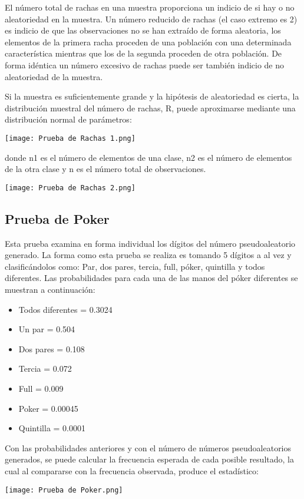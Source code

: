 \documentclass{article}
\begin{document}
El número total de rachas en una muestra proporciona un indicio de si hay o no aleatoriedad en la muestra. Un número reducido de rachas (el caso extremo es 2) es indicio de que las observaciones no se han extraído de forma aleatoria, los elementos de la primera racha proceden de una población con una determinada característica mientras que los de la segunda proceden de otra población. De forma idéntica un número excesivo de rachas puede ser también indicio de no aleatoriedad de la muestra.

Si la muestra es suficientemente grande y la hipótesis de aleatoriedad es cierta, la distribución muestral del número de rachas, R, puede aproximarse mediante una distribución normal de parámetros:
\begin{center}
    \texttt{[image: Prueba de Rachas 1.png]}
\end{center}

donde n1 es el número de elementos de una clase, n2 es el número de elementos de la otra clase y n es el número total de observaciones.
\begin{center}
    \texttt{[image: Prueba de Rachas 2.png]}
\end{center}

\subsection{Prueba de Poker}
Esta prueba examina en forma individual los dígitos del número pseudoaleatorio generado. La forma como esta prueba se realiza es tomando 5 dígitos a al vez y clasificándolos como: Par, dos pares, tercia, full, póker, quintilla y todos diferentes. Las probabilidades para cada una de las manos del póker diferentes se muestran a continuación:
\begin{itemize}
\item Todos diferentes = 0.3024
\item Un par = 0.504
\item Dos pares = 0.108
\item Tercia = 0.072
\item Full = 0.009
\item Poker = 0.00045
\item Quintilla = 0.0001
\end{itemize}

Con las probabilidades anteriores y con el número de números pseudoaleatorios generados, se puede calcular la frecuencia esperada de cada posible resultado, la cual al compararse con la frecuencia observada, produce el estadístico:
\begin{center}
    \texttt{[image: Prueba de Poker.png]}
\end{center}
\end{document}
